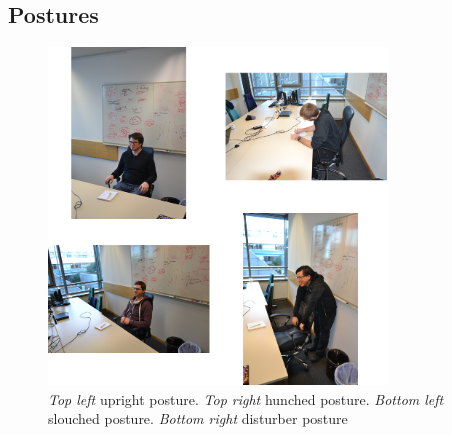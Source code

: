 \subsection{Postures}
\begin{figure}[h]
\centering
\includegraphics[width=0.8\textwidth]{images/app_eval_chair1}
\caption{\emph{Top left} upright posture. \emph{Top right} hunched posture. \emph{Bottom left} slouched posture. \emph{Bottom right} disturber posture}
\label{fig:disc_unob_elec}
\end{figure}




